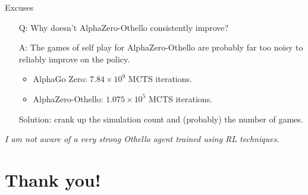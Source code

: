 \documentclass{beamer}
\begin{document}
\begin{frame}{Excuses}
  \begin{enumerate}
  \item[Q:] Why doesn't AlphaZero-Othello consistently improve?
\item[A:] The games of self play for AlphaZero-Othello are probably far too noisy to reliably improve on the policy.
  \begin{itemize}
  \item AlphaGo Zero: $7.84 \times 10^9$ MCTS iterations.
  \item AlphaZero-Othello: $1.075\times10^5$ MCTS iterations.
  \end{itemize}
  Solution: crank up the simulation count and (probably) the number of games.
  \end{enumerate}

  \textit{I am not aware of a very strong Othello agent trained using RL techniques.}
\end{frame}

\section{Thank you!}
\end{document}
